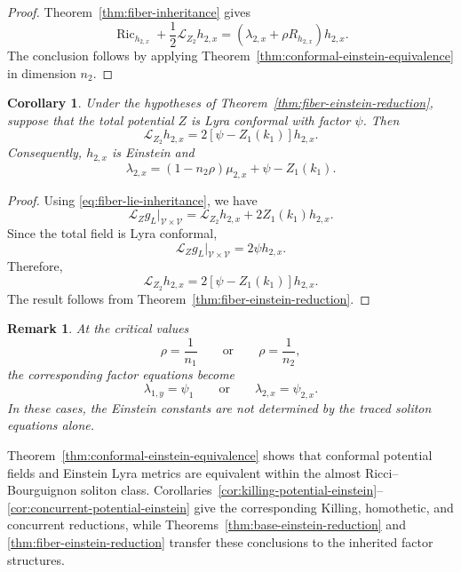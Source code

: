 \documentclass[a4paper,11pt]{article}
\theoremstyle{plain}
\newtheorem{corollary} {Corollary}[section]
\newtheorem{remark}{Remark}[section]
\numberwithin{equation}{section}
\begin{document}
\begin{proof}
	Theorem~\ref{thm:fiber-inheritance} gives
	\[
	\operatorname{Ric}_{h_{2,x}}
	+
	\frac12\mathcal L_{Z_{2}}h_{2,x}
	=
	\left(
	\lambda_{2,x}
	+
	\rho R_{h_{2,x}}
	\right)h_{2,x}.
	\]
	The conclusion follows by applying
	Theorem~\ref{thm:conformal-einstein-equivalence} in dimension
	\(n_{2}\).
\end{proof}

\begin{corollary}
	\label{cor:total-conformal-fiber-einstein}
	Under the hypotheses of
	Theorem~\ref{thm:fiber-einstein-reduction}, suppose that the
	total potential \(Z\) is Lyra conformal with factor \(\psi\).
	Then
	\begin{equation}
		\mathcal L_{Z_{2}}h_{2,x}
		=
		2
		\left[
		\psi-Z_{1}(k_{1})
		\right]
		h_{2,x}.
		\label{eq:fiber-induced-conformal-factor}
	\end{equation}
	Consequently, \(h_{2,x}\) is Einstein and
	\begin{equation}
		\lambda_{2,x}
		=
		(1-n_{2}\rho)\mu_{2,x}
		+
		\psi
		-
		Z_{1}(k_{1}).
		\label{eq:fiber-total-conformal-relation}
	\end{equation}
\end{corollary}

\begin{proof}
	Using \eqref{eq:fiber-lie-inheritance}, we have
	\[
	\mathcal L_{Z}g_{L}\big|_{\mathcal V\times\mathcal V}
	=
	\mathcal L_{Z_{2}}h_{2,x}
	+
	2Z_{1}(k_{1})h_{2,x}.
	\]
	Since the total field is Lyra conformal,
	\[
	\mathcal L_{Z}g_{L}\big|_{\mathcal V\times\mathcal V}
	=
	2\psi h_{2,x}.
	\]
	Therefore,
	\[
	\mathcal L_{Z_{2}}h_{2,x}
	=
	2
	\left[
	\psi-Z_{1}(k_{1})
	\right]
	h_{2,x}.
	\]
	The result follows from
	Theorem~\ref{thm:fiber-einstein-reduction}.
\end{proof}

\begin{remark}
	\label{rem:critical-factor-parameters}
	At the critical values
	\[
	\rho=\frac{1}{n_{1}}
	\qquad\text{or}\qquad
	\rho=\frac{1}{n_{2}},
	\]
	the corresponding factor equations become
	\[
	\lambda_{1,y}=\psi_{1}
	\qquad\text{or}\qquad
	\lambda_{2,x}=\psi_{2,x}.
	\]
	In these cases, the Einstein constants are not determined by
	the traced soliton equations alone.
\end{remark}

Theorem~\ref{thm:conformal-einstein-equivalence} shows that
conformal potential fields and Einstein Lyra metrics are
equivalent within the almost Ricci--Bourguignon soliton class.
Corollaries~\ref{cor:killing-potential-einstein}--
\ref{cor:concurrent-potential-einstein} give the corresponding
Killing, homothetic, and concurrent reductions, while
Theorems~\ref{thm:base-einstein-reduction} and
\ref{thm:fiber-einstein-reduction} transfer these conclusions to
the inherited factor structures. 
\end{document}
